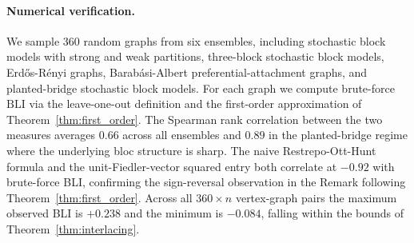 \documentclass[12pt, a4paper]{article}
\begin{document}
\paragraph{Numerical verification.} We sample $360$ random graphs from six ensembles, including stochastic block models with strong and weak partitions, three-block stochastic block models, Erd\H{o}s-R\'enyi graphs, Barab\'asi-Albert preferential-attachment graphs, and planted-bridge stochastic block models. For each graph we compute brute-force $\mathrm{BLI}$ via the leave-one-out definition and the first-order approximation of Theorem~\ref{thm:first_order}. The Spearman rank correlation between the two measures averages $0.66$ across all ensembles and $0.89$ in the planted-bridge regime where the underlying bloc structure is sharp. The naive Restrepo-Ott-Hunt formula and the unit-Fiedler-vector squared entry both correlate at $-0.92$ with brute-force BLI, confirming the sign-reversal observation in the Remark following Theorem~\ref{thm:first_order}. Across all $360 \times n$ vertex-graph pairs the maximum observed BLI is $+0.238$ and the minimum is $-0.084$, falling within the bounds of Theorem~\ref{thm:interlacing}.
\end{document}
